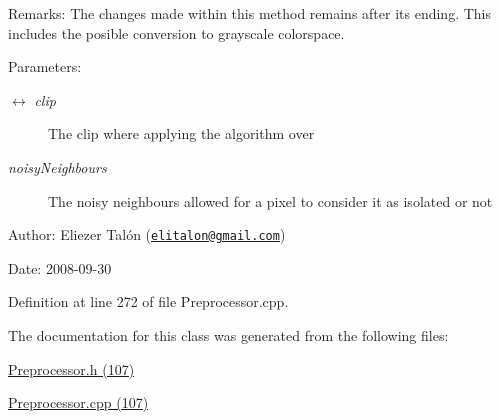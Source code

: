 \begin{Desc}
\item[Remarks:]The changes made within this method remains after its ending. This includes the posible conversion to grayscale colorspace.\end{Desc}
\begin{Desc}
\item[Parameters:]
\begin{description}
\item[\mbox{$\leftrightarrow$} {\em clip}]The clip where applying the algorithm over \item[{\em noisyNeighbours}]The noisy neighbours allowed for a pixel to consider it as isolated or not\end{description}
\end{Desc}
\begin{Desc}
\item[Author:]Eliezer Talón (\href{mailto:elitalon@gmail.com}{\tt elitalon@gmail.com}) \end{Desc}
\begin{Desc}
\item[Date:]2008-09-30 \end{Desc}


Definition at line 272 of file Preprocessor.cpp.

The documentation for this class was generated from the following files:\begin{CompactItemize}
\item 
\hyperlink{_preprocessor_8h}{Preprocessor.h (107)}\item 
\hyperlink{_preprocessor_8cpp}{Preprocessor.cpp (107)}\end{CompactItemize}
